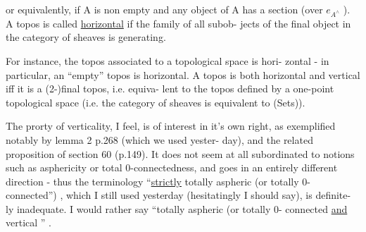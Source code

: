 or equivalently,  if A is non empty and any object of A has a section
(over $e_{A^\wedge}$ ).  A topos is called \uline{horizontal} if the family of all subob-%
jects of the final object in the category of sheaves  is generating.

For instance,  the topos associated to a topological space is hori-%
zontal -  in particular,  an ``empty'' topos is horizontal.  A topos is
both horizontal and vertical iff it is a (2-)final topos,  i.e. equiva-%
lent to the topos defined by a one-point topological space  (i.e. the
category of sheaves is equivalent to (Sets)).

The prorty of verticality, I feel,  is of interest in it's own
right,  as exemplified notably by lemma 2 p.268 (which we used yester-%
day),  and the related proposition of section 60 (p.149).  It does not
seem at all subordinated to notions such as  asphericity or total
0-connectedness,  and goes in an entirely different direction  - thus
the terminology  ``\uline{strictly} totally aspheric (or totally 0-connected'') ,
which I still used yesterday (hesitatingly\hand{,} I should say),  is definite-%
ly inadequate.  I would rather say  ``totally aspheric (or totally 0-%
connected\over{)}{)} \uline{and} vertical '' .

